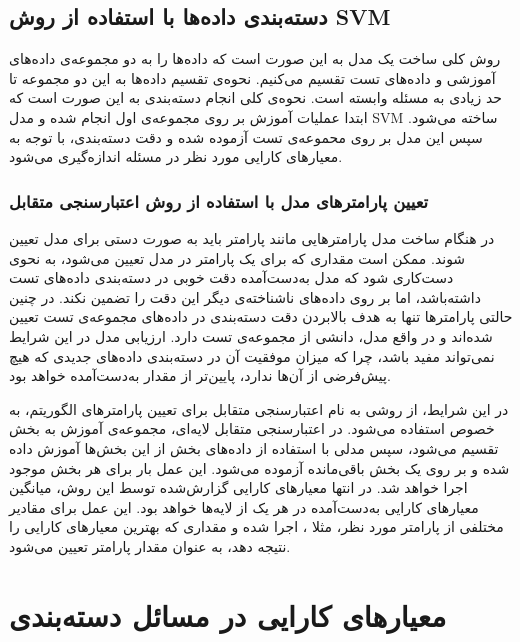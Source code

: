 \subsection{دسته‌بندی داده‌ها با استفاده از روش SVM}
روش کلی ساخت یک مدل  به این صورت است که داده‌ها را به دو مجموعه‌ی داده‌های آموزشی و داده‌های تست تقسیم می‌کنیم. نحوه‌ی تقسیم داده‌ها به این دو مجموعه تا حد زیادی به مسئله وابسته است. نحوه‌ی کلی انجام دسته‌بندی به این صورت است که ابتدا عملیات آموزش بر روی مجموعه‌ی اول انجام شده و مدل SVM ساخته می‌شود. سپس این مدل بر روی محموعه‌ی تست آزموده شده و دقت دسته‌بندی، با توجه به معیارهای کارایی مورد نظر در مسئله اندازه‌گیری می‌شود.

 \subsubsection{تعیین پارامترهای مدل با استفاده از روش اعتبارسنجی متقابل }
 در هنگام ساخت مدل  پارامترهایی مانند پارامتر  باید به صورت دستی برای مدل تعیین شوند. ممکن است مقداری که برای یک پارامتر در مدل تعیین می‌شود، به نحوی دست‌کاری شود که مدل به‌دست‌آمده دقت خوبی در دسته‌بندی داده‌های تست داشته‌باشد، اما بر روی داده‌های ناشناخته‌ی دیگر این دقت را تضمین نکند. در چنین حالتی پارامترها تنها به هدف بالابردن دقت دسته‌بندی در داده‌های مجموعه‌ی تست تعیین شده‌اند و در واقع مدل، دانشی از مجموعه‌ی تست دارد. ارزیابی مدل در این شرایط نمی‌تواند مفید باشد، چرا که میزان موفقیت آن در دسته‌بندی داده‌های جدیدی که هیچ پیش‌فرضی از آن‌ها ندارد، پایین‌تر از مقدار به‌دست‌آمده خواهد بود.

در این شرایط، از روشی به نام اعتبارسنجی متقابل برای تعیین پارامترهای الگوریتم، به خصوص  استفاده می‌شود. در اعتبارسنجی متقابل  لایه‌ای، مجموعه‌ی آموزش به  بخش تقسیم می‌شود، سپس مدلی با استفاده از داده‌های  بخش از این بخش‌ها آموزش داده شده و بر روی یک بخش باقی‌مانده آزموده می‌شود. این عمل  بار برای هر  بخش موجود اجرا خواهد شد. در انتها معیارهای کارایی گزارش‌شده توسط این روش، میانگین معیارهای کارایی به‌دست‌آمده  در هر یک از لایه‌ها خواهد بود. این عمل برای مقادیر مختلفی از پارامتر مورد نظر، مثلا ، اجرا شده و مقداری که بهترین معیارهای کارایی را نتیجه دهد، به عنوان مقدار پارامتر تعیین می‌شود.


\section{معیارهای کارایی در مسائل دسته‌بندی}

